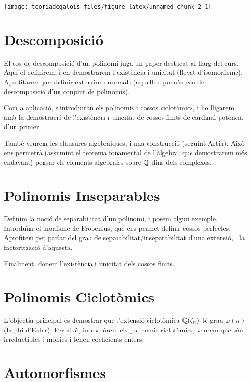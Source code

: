 \documentclass[
]{book}
\theoremstyle{definition}
\theoremstyle{definition}
\theoremstyle{definition}
\theoremstyle{definition}
\theoremstyle{remark}
\begin{document}
\texttt{[image: teoriadegalois\_files/figure-latex/unnamed-chunk-2-1]}

\hypertarget{descomposiciuxf3}{%
\chapter{Descomposició}\label{descomposiciuxf3}}

El cos de descomposició d'un polinomi juga un paper destacat al llarg del curs.
Aquí el definirem, i en demostrarem l'existència i unicitat (llevat d'isomorfisme).
Aprofitarem per definir extensions normals (aquelles que són cos de descomposició d'un conjunt de polinomis).

Com a aplicació, s'introduiran els polinomis i cossos ciclotòmics, i ho lligarem amb la
demostració de l'existència i unicitat de cossos finits de cardinal potència d'un primer.

També veurem les clausures algebraiques, i una construcció (seguint Artin). Això ens permetrà (assumint el teorema fonamental
de l'àlgebra, que demostrarem més endavant) pensar els elements algebraics sobre \(\mathbb{Q}\) dins dels complexos.

\hypertarget{polinomis-inseparables}{%
\chapter{Polinomis Inseparables}\label{polinomis-inseparables}}

Definim la noció de separabilitat d'un polinomi, i posem algun exemple. Introduïm el morfisme de Frobenius,
que ens permet definir cossos perfectes. Aprofitem per parlar del grau de separabilitat/inseparabilitat d'una
extensió, i la factorització d'aquesta.

Finalment, donem l'existència i unicitat dels cossos finits.

\hypertarget{polinomis-ciclotuxf2mics}{%
\chapter{Polinomis Ciclotòmics}\label{polinomis-ciclotuxf2mics}}

L'objectiu principal és demostrar que l'extensió ciclotòmica \(\mathbb{Q}(\zeta_n)\) té grau \(\varphi(n)\) (la phi d'Euler). Per això,
introduïrem els polinomis ciclotòmics, veurem que són irreductibles i mònics i tenen coeficients enters.

\hypertarget{automorfismes}{%
\chapter{Automorfismes}\label{automorfismes}}
\end{document}
